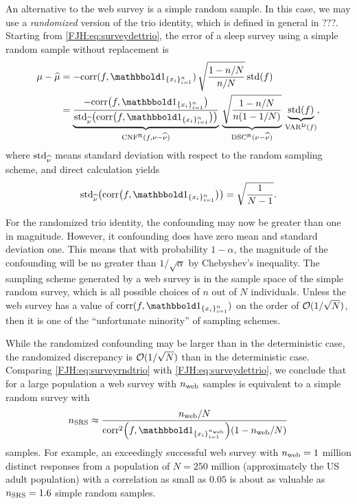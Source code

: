\documentclass[graybox,footinfo]{svmult}
\DeclareMathOperator{\algn}{CNF}
\DeclareMathOperator{\disc}{DSC}
\DeclareMathOperator{\Var}{VAR}
\begin{document}
An alternative to the web survey is a simple random sample.  In this 
case, we may use a 
\emph{randomized} version of the trio identity, which is defined in general in ???.  Starting 
from \eqref{FJH:eq:surveydettrio}, the 
error of a sleep survey using a simple random sample without replacement is
\begin{align}
\nonumber
\mu - \widehat{\mu} 
& = -\corr(f, \bbone_{\{x_i\}_{i=1}^n}) \,
\sqrt{\frac{1 - n/N}{n/N}} \, 
\std(f) \\
& = \underbrace{\frac{- \corr\bigl(f, \bbone_{\{x_i\}_{i=1}^n}\bigr)}
{\std_{\hnu} \bigl( \corr\bigl(f, \bbone_{\{x_i\}_{i=1}^n}\bigr)\bigr)}}_{\algn^\Rn(f,\nu - \hnu)} 
\, 
\underbrace{\sqrt{\frac{1-n/N}{n(1-1/N)}}}_{\disc^\Rn(\nu - \hnu)} \, 
\underbrace{\std(f)}_{\Var^\Dt(f)},
\label{FJH:eq:surveyrndtrio}
\end{align}
where $\textup{std}_{\widehat{\nu}}$ means standard deviation with respect to the random sampling 
scheme, and direct calculation yields
\begin{equation*}
\std_{\hnu} \bigl( \corr\bigl(f, \bbone_{\{x_i\}_{i=1}^n}\bigr)\bigr) = \sqrt{\frac{1}{N-1}}.
\end{equation*}

For the randomized trio identity, the confounding may now be greater than one in 
magnitude.  However, it confounding does have zero mean and 
standard deviation one.  This means that with probability $1-\alpha$, the magnitude of 
the confounding will be no greater than $1/\sqrt{\alpha}$ by Chebyshev's inequality. The 
sampling scheme generated by a web survey is in the sample space of the simple 
random survey, which is all possible choices of $n$ out of $N$ individuals.  Unless the 
web survey has a value of $\corr(f, \bbone_{\{x_i\}_{i=1}^n})$ 
on the order of $\mathcal{O}(1/\sqrt{N})$, then it is one of the ``unfortunate minority'' of 
sampling schemes.

While the randomized confounding may be larger than in the deterministic case, 
the randomized discrepancy is $\mathcal{O}(1/\sqrt{N})$ than in the 
deterministic case.  Comparing \eqref{FJH:eq:surveyrndtrio} with 
\eqref{FJH:eq:surveydettrio}, we conclude that for a large population a web survey with 
$n_{\textup{web}}$ samples is equivalent to a simple random survey with 
\[
n_{\textup{SRS}} \approx \frac{n_{\textup{web}}/N}{\corr^2\Bigl(f, 
\bbone_{\{x_i\}_{i=1}^{n_{\textup{web}}}}\Bigr)(1-n_{\textup{web}}/N)}
\]
samples.  For example, an exceedingly successful web survey with $n_{\textup{web}} = 
1$ million distinct responses from a population of $N = 250$ million 
(approximately the US adult population) with a correlation as small as $0.05$ is about as 
valuable as $n_{\textup{SRS}} = 1.6$ simple random samples.
\end{document}
